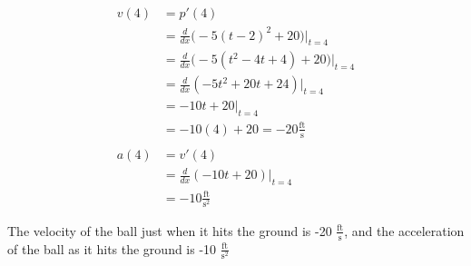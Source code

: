 \documentclass{MathNotes}
\begin{document}
\begin{align*}
	v(4) & =p'(4)                                            \\
	     & =\frac{d}{dx}\big(-5(t-2)^2+20\big)\Big|_{t=4}    \\
	     & =\frac{d}{dx}\big(-5(t^2-4t+4)+20\big)\Big|_{t=4} \\
	     & =\frac{d}{dx}(-5t^2+20t+24)\Big|_{t=4}            \\
	     & =-10t+20\Big|_{t=4}                               \\
	     & =-10(4)+20=-20\frac{\text{ft}}{\text{s}}          \\
	\\
	a(4) & =v'(4)                                            \\
	     & =\frac{d}{dx}(-10t+20)\Big|_{t=4}                 \\
	     & =-10\frac{\text{ft}}{\text{s}^2}
\end{align*}

The velocity of the ball just when it hits the ground is -20
$\displaystyle\frac{\text{ft}}{\text{s}}$, and the acceleration of the ball as
it hits the ground is -10 $\frac{\text{ft}}{\text{s}^2}$

\newpage
\end{document}
